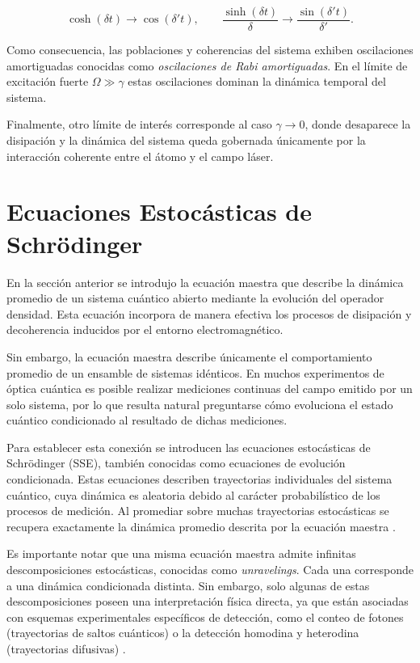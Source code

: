 \documentclass[11pt]{report}
\begin{document}
\begin{equation}
\cosh(\delta t) \rightarrow \cos(\delta' t),
\qquad
\frac{\sinh(\delta t)}{\delta} \rightarrow
\frac{\sin(\delta' t)}{\delta'}.
\end{equation}

Como consecuencia, las poblaciones y coherencias del sistema exhiben oscilaciones amortiguadas conocidas como \textit{oscilaciones de Rabi amortiguadas}. En el límite de excitación fuerte $\Omega \gg \gamma$ estas oscilaciones dominan la dinámica temporal del sistema.

Finalmente, otro límite de interés corresponde al caso $\gamma \rightarrow 0$, donde desaparece la disipación y la dinámica del sistema queda gobernada únicamente por la interacción coherente entre el átomo y el campo láser.


\section{Ecuaciones Estocásticas de Schrödinger}

En la sección anterior se introdujo la ecuación maestra que describe la dinámica promedio de un sistema cuántico abierto mediante la evolución del operador densidad. Esta ecuación incorpora de manera efectiva los procesos de disipación y decoherencia inducidos por el entorno electromagnético.

Sin embargo, la ecuación maestra describe únicamente el comportamiento promedio de un ensamble de sistemas idénticos. En muchos experimentos de óptica cuántica es posible realizar mediciones continuas del campo emitido por un solo sistema, por lo que resulta natural preguntarse cómo evoluciona el estado cuántico condicionado al resultado de dichas mediciones.

Para establecer esta conexión se introducen las ecuaciones estocásticas de Schrödinger (SSE), también conocidas como ecuaciones de evolución condicionada. Estas ecuaciones describen trayectorias individuales del sistema cuántico, cuya dinámica es aleatoria debido al carácter probabilístico de los procesos de medición. Al promediar sobre muchas trayectorias estocásticas se recupera exactamente la dinámica promedio descrita por la ecuación maestra \cite{Carmichael1993,WisemanMilburn2010}.


Es importante notar que una misma ecuación maestra admite infinitas descomposiciones estocásticas, conocidas como \textit{unravelings}. Cada una corresponde a una dinámica condicionada distinta. Sin embargo, solo algunas de estas descomposiciones poseen una interpretación física directa, ya que están asociadas con esquemas experimentales específicos de detección, como el conteo de fotones (trayectorias de saltos cuánticos) o la detección homodina y heterodina (trayectorias difusivas) \cite{Carmichael1993,WisemanMilburn2010}.
\end{document}
